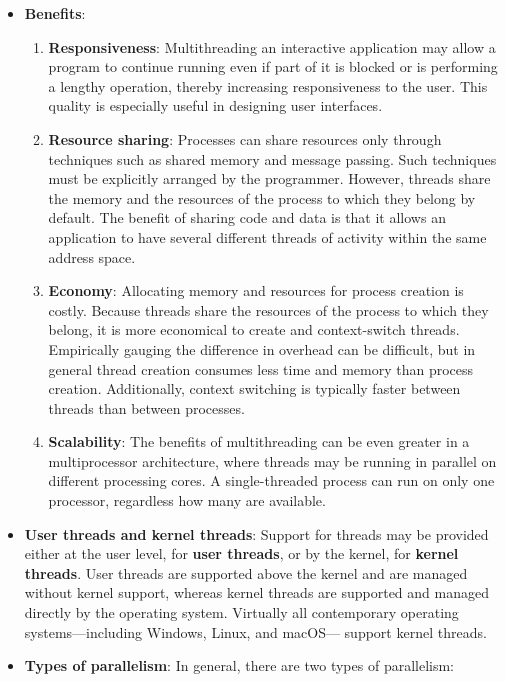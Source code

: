 \documentclass{report}
\begin{document}
    \pagebreak 
    \begin{itemize}
               \item \textbf{Benefits}: 
            \begin{enumerate}
                \item \textbf{Responsiveness}: Multithreading an interactive application may allow a program to continue running even if part of it is blocked or is performing a lengthy operation, thereby increasing responsiveness to the user. This quality is especially useful in designing user interfaces. 
                \item \textbf{Resource sharing}: Processes can share resources only through techniques such as shared memory and message passing. Such techniques must be explicitly arranged by the programmer. However, threads share the memory and the resources of the process to which they belong by default. The benefit of sharing code and data is that it allows an application to have several different threads of activity within the same address space.
                \item \textbf{Economy}: Allocating memory and resources for process creation is costly. Because threads share the resources of the process to which they belong, it is more economical to create and context-switch threads. Empirically gauging the difference in overhead can be difficult, but in general thread creation consumes less time and memory than process creation. Additionally, context switching is typically faster between threads than between processes.
                \item \textbf{Scalability}: The benefits of multithreading can be even greater in a multiprocessor architecture, where threads may be running in parallel on different processing cores. A single-threaded process can run on only one processor, regardless how many are available.
            \end{enumerate}
         \item \textbf{User threads and kernel threads}: Support for threads may be provided either at the user level, for \textbf{user threads}, or by the kernel, for \textbf{kernel threads}. User threads are supported above the kernel and are managed without kernel support, whereas kernel threads are supported and managed directly by the operating system. Virtually all contemporary operating systems—including Windows, Linux, and macOS— support kernel threads.
        \item \textbf{Types of parallelism}: In general, there are two types of parallelism:

\end{itemize}
\end{document}

